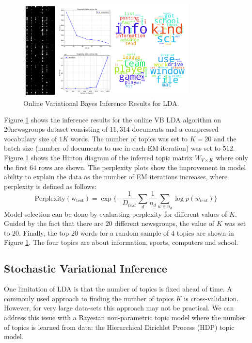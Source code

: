 \begin{figure}[tbhp]
    \centering
    \includegraphics[width=0.8\textwidth, trim={10 10 10 10}]{figures/lda_onlinevb.png}
    \caption{Online Variational Bayes Inference Results for LDA.}
    \label{fig:lda_onlinevb}
\end{figure}

Figure \ref{fig:lda_onlinevb} shows the inference results for the online VB LDA algorithm on 20newsgroups dataset consisting of $11,314$ documents and a compressed vocabulary size of $1K$ words. The number of topics was set to $K=20$ and the batch size (number of documents to use in each EM iteration) was set to $512$. Figure \ref{fig:lda_onlinevb} shows the Hinton diagram of the inferred topic matrix $W_{V\times K}$ where only the first $64$ rows are shown. The perplexity plots show the improvement in model ability to explain the data as the number of EM iterations increases, where perplexity is defined as follows:
\begin{equation}\label{equ:perplexity1}
   \mathrm{Perplexity(w_{test})} = \exp\{-\frac{1}{D_{test}}\sum_{d} \frac{1}{n_d} \sum_{w \in n_d} \log p(w_{test})\}
\end{equation}
Model selection can be done by evaluating perplexity for different values of $K$. Guided by the fact that there are $20$ different newsgroups, the value of $K$ was set to $20$. Finally, the top $20$ words for a random sample of $4$ topics are shown in Figure \ref{fig:lda_onlinevb}. The four topics are about information, sports, computers and school.\\

\subsection{Stochastic Variational Inference}

One limitation of LDA is that the number of topics is fixed ahead of time. A commonly used approach to finding the number of topics $K$ is cross-validation. However, for very large data-sets this approach may not be practical. We can address this issue with a Bayesian non-parametric topic model where the number of topics is learned from data: the Hierarchical Dirichlet Process (HDP) topic model.\\

